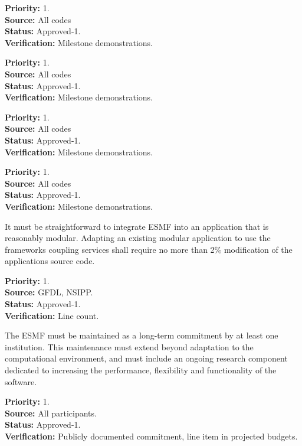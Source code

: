 \begin{reqlist}
{\bf Priority:} 1. \\
{\bf Source:} All codes\\
{\bf Status:} Approved-1. \\
{\bf Verification:} Milestone demonstrations.
\end{reqlist}

\begin{reqlist}
{\bf Priority:} 1. \\
{\bf Source:} All codes\\
{\bf Status:} Approved-1. \\
{\bf Verification:} Milestone demonstrations.
\end{reqlist}

\begin{reqlist}
{\bf Priority:} 1. \\
{\bf Source:} All codes\\
{\bf Status:} Approved-1. \\
{\bf Verification:} Milestone demonstrations.
\end{reqlist}

\begin{reqlist}
{\bf Priority:} 1. \\
{\bf Source:} All codes\\
{\bf Status:} Approved-1. \\
{\bf Verification:} Milestone demonstrations.
\end{reqlist}

It must be straightforward to integrate ESMF into an application 
that is reasonably modular. Adapting an existing modular application
to use the frameworks coupling services shall require no more
than 2\% modification of the applications source code.
\begin{reqlist}
{\bf Priority:} 1. \\
{\bf Source:} GFDL, NSIPP. \\
{\bf Status:} Approved-1. \\
{\bf Verification:} Line count.
\end{reqlist}

The ESMF must be maintained as a long-term commitment by at least one
institution.  This maintenance must extend beyond adaptation to the 
computational environment, and must include an ongoing research component
dedicated to increasing the performance, flexibility and functionality of
the software.
\begin{reqlist}
{\bf Priority:} 1. \\
{\bf Source:} All participants. \\
{\bf Status:} Approved-1. \\
{\bf Verification:} Publicly documented commitment, line item in 
projected budgets.
\end{reqlist}






